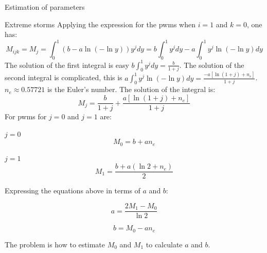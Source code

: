 \documentclass[8pt]{beamer}
\renewcommand{\emph}[1]{\textcolor{myorange}{#1}}
\begin{document}
\begin{frame}{Estimation of parameters}

    \begin{exampleblock}{Extreme storms}
Applying the expression for the \emph{pwms} when $i=1$ and $k=0$, one has:
\[
    M_{ijk} = M_j = \int_0^1 \left( b-a \ln ( -\ln y) \right) y^j dy = b \int_0^1 y^j dy - a \int_0^1 y^j \ln ( -\ln y) dy  
\]
The solution of the first integral is easy $b \int_0^1 y^j dy = \frac{b}{1+j}$. The solution of the second integral is complicated, this is $a \int_0^1 y^j \ln ( -\ln y) dy = \frac{-a \left[ \ln (1+j) + n_e\right]}{1+j}$. $n_e \approx 0.57721$ is the \emph{Euler's number}. The solution of the integral is:
\[
    M_j = \frac{b}{1+j} + \frac{a \left[ \ln (1+j) + n_e\right]}{1+j}
\]
For \emph{pwms} for $j=0$ and $j=1$ are:

\begin{minipage}[t]{0.44\textwidth}
\centering
\textbf{$j=0$}
\[
    M_0 = b + a n_e
\]
\end{minipage}
\hfill
\begin{minipage}[t]{0.44\textwidth}
\centering
\textbf{$j=1$}
\[
    M_1 = \frac{b + a(\ln 2 + n_e)}{2}
\]
\end{minipage}

Expressing the equations above in terms of $a$ and $b$:

\begin{minipage}[t]{0.44\textwidth}
\centering
\[
    a = \frac{2M_1 - M_0}{\ln 2}
\]
\end{minipage}
\hfill
\begin{minipage}[t]{0.44\textwidth}
\centering
\[
    b = M_0 - a n_e 
\]
\end{minipage}

The problem is how to estimate $M_0$ and $M_1$ to calculate $a$ and $b$. 
    \end{exampleblock}
\end{frame}
\end{document}
